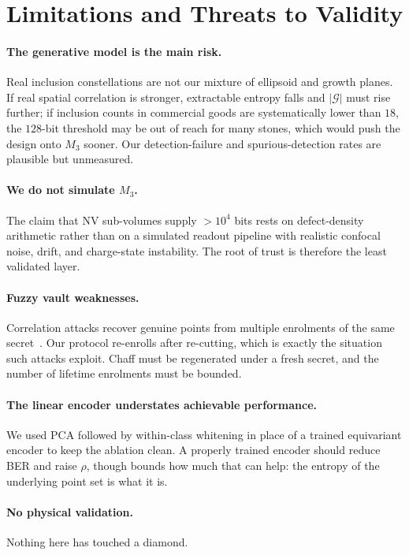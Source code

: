 \documentclass[10pt,twocolumn]{article}
\theoremstyle{remark}
\begin{document}
\section{Limitations and Threats to Validity}
\label{sec:limits}

\paragraph{The generative model is the main risk.} Real inclusion
constellations are not our mixture of ellipsoid and growth planes. If real
spatial correlation is stronger, extractable entropy falls and $|\mathcal{G}|$
must rise further; if inclusion counts in commercial goods are systematically
lower than $18$, the $128$-bit threshold may be out of reach for many stones,
which would push the design onto $M_3$ sooner. Our detection-failure and
spurious-detection rates are plausible but unmeasured.

\paragraph{We do not simulate $M_3$.} The claim that NV sub-volumes supply
$>10^4$ bits rests on defect-density arithmetic rather than on a simulated
readout pipeline with realistic confocal noise, drift, and charge-state
instability. The root of trust is therefore the least validated layer.

\paragraph{Fuzzy vault weaknesses.} Correlation attacks recover genuine points
from multiple enrolments of the same secret~\cite{scheirer2007}. Our protocol
re-enrolls after re-cutting, which is exactly the situation such attacks
exploit. Chaff must be regenerated under a fresh secret, and the number of
lifetime enrolments must be bounded.

\paragraph{The linear encoder understates achievable performance.} We used PCA
followed by within-class whitening in place of a trained equivariant encoder to
keep the ablation clean. A properly trained encoder should reduce BER and raise
$\rho$, though  bounds how much that can help: the entropy of
the underlying point set is what it is.

\paragraph{No physical validation.} Nothing here has touched a diamond.
\end{document}
